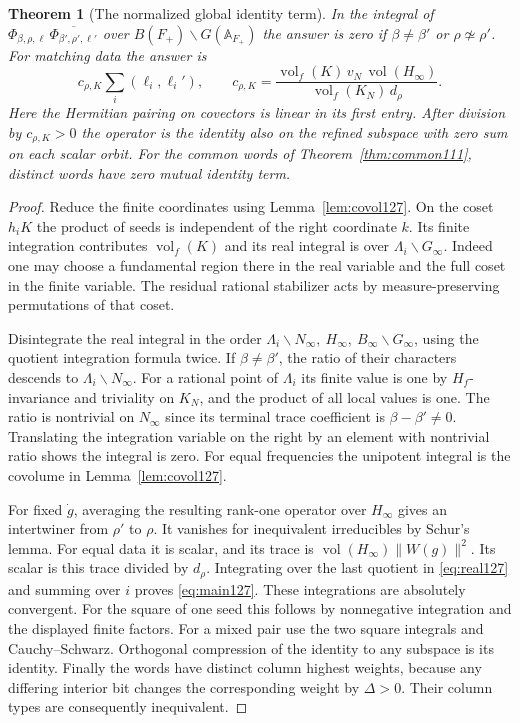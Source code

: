 \documentclass[a4paper,11pt]{article}
\newtheorem{theorem}[proposition]{Theorem}
\theoremstyle{definition}
\theoremstyle{remark}
\numberwithin{equation}{section}
\begin{document}
\begin{theorem}[The normalized global identity term]
\label{thm:identity127}
In the integral of \(\Phi_{\beta,\rho,\ell}\,
\overline{\Phi_{\beta',\rho',\ell'}}\) over
\(B(F_+)\backslash G(\mathbb A_{F_+})\) the answer is zero
if \(\beta\ne\beta'\) or \(\rho\not\simeq\rho'\). For matching
data the answer is
\begin{equation}
 c_{\rho,K}\sum_i(\ell_i,\ell_i'),\qquad
 c_{\rho,K}=
 \frac{\operatorname{vol}_f(K)\,v_N\,\operatorname{vol}(H_\infty)}
      {\operatorname{vol}_f(K_N)\,d_\rho}.
 \label{eq:main127}
\end{equation}
Here the Hermitian pairing on covectors is linear in its first
entry. After division by \(c_{\rho,K}>0\) the operator is the
identity also on the refined subspace with zero sum on each
scalar orbit. For the common words of Theorem~\ref{thm:common111},
distinct words have zero mutual identity term.
\end{theorem}
\begin{proof}
Reduce the finite coordinates using Lemma~\ref{lem:covol127}.
On the coset \(h_iK\) the product of seeds is independent of the
right coordinate \(k\). Its finite integration contributes
\(\operatorname{vol}_f(K)\) and its real integral is over
\(\Lambda_i\backslash G_\infty\). Indeed one may choose a
fundamental region there in the real variable and the full coset
in the finite variable. The residual rational stabilizer acts by
measure-preserving permutations of that coset.

Disintegrate the real integral in the order
\(\Lambda_i\backslash N_\infty,\ H_\infty,\
B_\infty\backslash G_\infty\), using the quotient integration
formula twice. If \(\beta\ne\beta'\), the ratio of their characters
descends to \(\Lambda_i\backslash N_\infty\). For a rational point
of \(\Lambda_i\) its finite value is one by \(H_f\)-invariance and
triviality on \(K_N\), and the product of all local values is one.
The ratio is nontrivial on \(N_\infty\) since its terminal trace
coefficient is \(\beta-\beta'\ne0\). Translating the integration
variable on the right by an element with nontrivial ratio shows
the integral is zero. For equal frequencies the unipotent integral
is the covolume in Lemma~\ref{lem:covol127}.

For fixed \(\dot g\), averaging the resulting rank-one operator
over \(H_\infty\) gives an intertwiner from \(\rho'\) to \(\rho\).
It vanishes for inequivalent irreducibles by Schur's lemma.
For equal data it is scalar, and its trace is
\(\operatorname{vol}(H_\infty)\|W(g)\|^2\). Its scalar is this
trace divided by \(d_\rho\). Integrating over the last quotient
in \eqref{eq:real127} and summing over \(i\) proves
\eqref{eq:main127}. These integrations are absolutely convergent.
For the square of one seed this follows by nonnegative integration
and the displayed finite factors. For a mixed pair use the two
square integrals and Cauchy--Schwarz. Orthogonal compression of
the identity to any subspace is its identity. Finally the words
have distinct column highest weights, because any differing
interior bit changes the corresponding weight by \(\Delta>0\).
Their column types are consequently inequivalent.
\end{proof}
\end{document}
